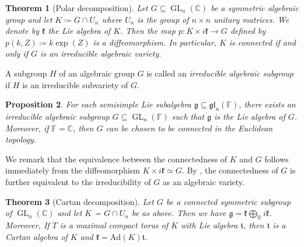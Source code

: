 \documentclass[11pt,reqno]{amsart}
\DeclareMathOperator{\GL}{GL}
\newtheorem{theorem}{Theorem}[section]
\newtheorem{proposition}[theorem]{Proposition}
\newcommand{\RR}{\mathbb{R}} %
\newcommand{\CC}{\mathbb{C}} %
\newcommand{\FF}{\mathbb{F}} %
\newcommand{\Ad}{\mathrm{Ad}}
\begin{document}
\begin{theorem}[Polar decomposition]\label{thm: polar decomposition}\cite[Theorem 2.12]{wallach2017geometric}
Let $G \subseteq \GL_n(\CC)$ be a symmetric algebraic group and let $K \coloneqq G\cap U_n$ where $U_n$ is the group of $n\times n$  unitary matrices.  We denote by $\mathfrak{k}$ the Lie algebra of $K$.  Then the map $p: K \times i \mathfrak{k} \to G$ defined by $p(k,  Z) \coloneqq k \exp (Z)$ is a diffeomorphism.  In particular,  $K$ is connected if and only if $G$ is an irreducible algebraic variety.
\end{theorem}

A subgroup $H$ of an algebraic group $G$ is called an \emph{irreducible algebraic subgroup} if $H$ is an irreducible subvariety of $G$.
\begin{proposition}\cite[Section 4.1.2]{onishchik2012lie}\label{prop:semisimple algebraic}
For each semisimple Lie subalgebra $\mathfrak{g} \subseteq \mathfrak{gl}_n(\mathbb{F})$,  there exists an irreducible algebraic subgroup $G \subseteq \GL_n(\mathbb{F})$ such that $\mathfrak{g}$ is the Lie algebra of $G$.  Moreover,  if $\mathbb{F} = \mathbb{C}$,  then $G$ can be chosen to be connected in the Euclidean topology. 
\end{proposition}

We remark that the equivalence between the connectedness of $K$ and $G$ follows immediately from the diffeomorphism $K \times i \mathfrak{k} \simeq G$.  By \cite[Corollary 2.14]{wallach2017geometric} ,  the connectedness of $G$ is further equivalent to the irreducibility of $G$ as an algebraic variety.  
\begin{theorem}[Cartan decomposition]\label{thm: Cartan decomposition}\cite[Corollary 2.20]{wallach2017geometric}
Let $G$ be a connected symmetric subgroup of $\GL_n(\CC)$ and let $K$ = $G\cap U_n$ be as above. Then we have $\mathfrak{g} = \mathfrak{k} \bigoplus_{\RR} i\mathfrak{k}$.  Moreover,  If $T$ is a maximal compact torus of $K$ with Lie algebra $\mathfrak{t}$,  then $\mathfrak{t}$ is a Cartan algebra of $K$ and $ \mathfrak{k} = \Ad(K)\mathfrak{t}$.
\end{theorem}
\end{document}
